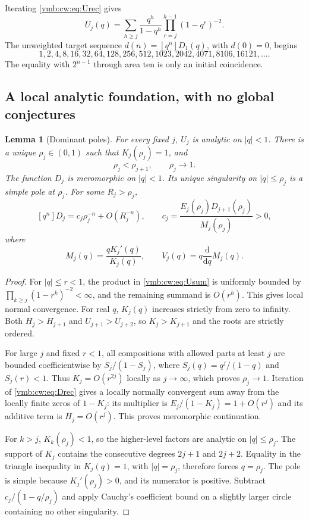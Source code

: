 \documentclass[11pt,a4paper]{article}
\numberwithin{equation}{section}
\newtheorem{lemma}[theorem]{Lemma}
\theoremstyle{definition}\newtheorem{definition}[theorem]{Definition}
\theoremstyle{remark}\newtheorem{remark}[theorem]{Remark}
\newcommand{\coeff}[2]{[#1^{#2}]}
\newcommand{\dd}{\mathrm d}
\begin{document}
Iterating \eqref{vmb:cw:eq:Urec} gives
\begin{equation}\label{vmb:cw:eq:Usum}
 U_j(q)=\sum_{h\ge j}\frac{q^h}{1-q^h}
                   \prod_{r=j}^{h-1}(1-q^r)^{-2}.
\end{equation}
The unweighted target sequence $d(n)=\coeff qn D_1(q)$, with $d(0)=0$, begins
\[
1,2,4,8,16,32,64,128,256,512,1023,2042,4071,8106,16121,\ldots.
\]
The equality with $2^{n-1}$ through area ten is only an initial coincidence.

\subsection{A local analytic foundation, with no global conjectures}
\begin{lemma}[Dominant poles]\label{vmb:cw:lem:poles}
For every fixed $j$, $U_j$ is analytic on $|q|<1$. There is a unique
$\rho_j\in(0,1)$ such that $K_j(\rho_j)=1$, and
\[
 \rho_j<\rho_{j+1},\qquad \rho_j\longrightarrow1.
\]
The function $D_j$ is meromorphic on $|q|<1$. Its unique singularity on
$|q|\le\rho_j$ is a simple pole at $\rho_j$. For some $R_j>\rho_j$,
\begin{equation}\label{vmb:cw:eq:basepole}
 \coeff qn D_j=c_j\rho_j^{-n}+O(R_j^{-n}),\qquad
 c_j=\frac{E_j(\rho_j)D_{j+1}(\rho_j)}{M_j(\rho_j)}>0,
\end{equation}
where
\begin{equation}\label{vmb:cw:eq:moments}
 M_j(q)=\frac{qK_j'(q)}{K_j(q)},\qquad
 V_j(q)=q\frac{\dd}{\dd q}M_j(q).
\end{equation}
\end{lemma}
\begin{proof}
For $|q|\le r<1$, the product in \eqref{vmb:cw:eq:Usum} is uniformly bounded by
$\prod_{k\ge j}(1-r^k)^{-2}<\infty$, and the remaining summand is $O(r^h)$.
This gives local normal convergence. For real $q$, $K_j(q)$ increases
strictly from zero to infinity. Both $H_j>H_{j+1}$ and $U_{j+1}>U_{j+2}$,
so $K_j>K_{j+1}$ and the roots are strictly ordered.

For large $j$ and fixed $r<1$, all compositions with allowed parts at least
$j$ are bounded coefficientwise by $S_j/(1-S_j)$, where
$S_j(q)=q^j/(1-q)$ and $S_j(r)<1$. Thus $K_j=O(r^{2j})$ locally as
$j\to\infty$, which proves $\rho_j\to1$. Iteration of \eqref{vmb:cw:eq:Drec}
gives a locally normally convergent sum away from the locally finite zeros
of $1-K_j$: its multiplier is $E_j/(1-K_j)=1+O(r^j)$ and its additive
term is $H_j=O(r^j)$. This proves meromorphic continuation.

For $k>j$, $K_k(\rho_j)<1$, so the higher-level factors are analytic on
$|q|\le\rho_j$. The support of $K_j$ contains the consecutive degrees
$2j+1$ and $2j+2$. Equality in the triangle inequality in
$K_j(q)=1$, with $|q|=\rho_j$, therefore forces $q=\rho_j$. The pole is
simple because $K_j'(\rho_j)>0$, and its numerator is positive. Subtract
$c_j/(1-q/\rho_j)$ and apply Cauchy's coefficient bound on a slightly
larger circle containing no other singularity.
\end{proof}
\end{document}
